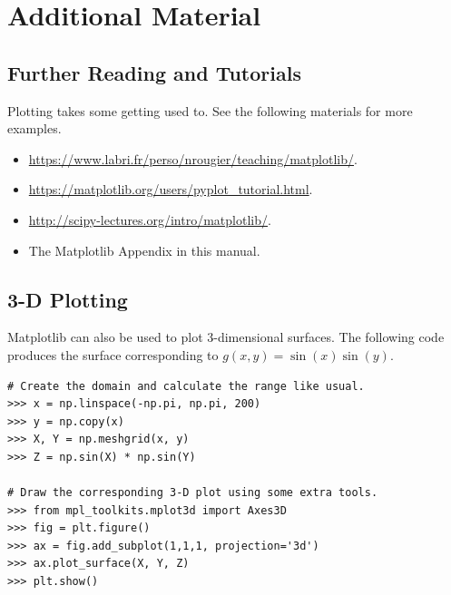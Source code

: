 \newpage

\section*{Additional Material} %

\subsection*{Further Reading and Tutorials} %

Plotting takes some getting used to.
See the following materials for more examples.
\begin{itemize}
    \item \url{https://www.labri.fr/perso/nrougier/teaching/matplotlib/}.
    \item \url{https://matplotlib.org/users/pyplot_tutorial.html}.
    \item \url{http://scipy-lectures.org/intro/matplotlib/}.
    \item The Matplotlib Appendix in this manual.
\end{itemize}

\subsection*{3-D Plotting} %

Matplotlib can also be used to plot 3-dimensional surfaces.
The following code produces the surface corresponding to $g(x,y) = \sin(x)\sin(y)$.

\begin{lstlisting}
# Create the domain and calculate the range like usual.
>>> x = np.linspace(-np.pi, np.pi, 200)
>>> y = np.copy(x)
>>> X, Y = np.meshgrid(x, y)
>>> Z = np.sin(X) * np.sin(Y)

# Draw the corresponding 3-D plot using some extra tools.
>>> from mpl_toolkits.mplot3d import Axes3D
>>> fig = plt.figure()
>>> ax = fig.add_subplot(1,1,1, projection='3d')
>>> ax.plot_surface(X, Y, Z)
>>> plt.show()
\end{lstlisting}

